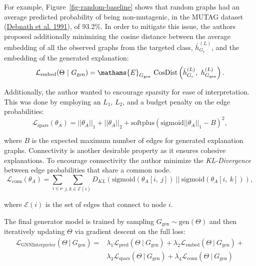 \documentclass[
  11pt,
  letterpaper,
]{article}
\begin{document}
For example, Figure~\ref{fig-random-baseline} shows that random graphs
had an average predicted probability of being non-mutagenic, in the
MUTAG dataset (\protect\hyperlink{ref-Debnath_1991}{Debnath et al.
1991}), of 93.2\%. In order to mitigate this issue, the authors proposed
additionally minimizing the cosine distance between the average
embedding of all the observed graphs from the targeted class,
\(\bar h^{(L)}_{G_c}\), and the embedding of the generated explanation:
\begin{equation} \label{l-embed}
    \mathcal{L}_{\text{embed}}(\Theta \ | \ G_\text{gen}) = \mathams{E}_{G_\text{gen}} \ \text{CosDist}\left( \bar h^{(L)}_{G_c}, \ h^{(L)}_{G_\text{gen}} \right). 
\end{equation}

Additionally, the author wanted to encourage sparsity for ease of
interpretation. This was done by employing an \(L_1\), \(L_2\), and a
budget penalty on the edge probabilities:\\
\begin{equation} \label{l-spars}
    \mathcal{L}_{\text{spars}}(\theta_A) = ||\theta_A||_1 + ||\theta_A||_2 + \text{softplus}(\text{sigmoid}||\theta_A||_1 - B)^2, 
\end{equation}

where \(B\) is the expected maximum number of edges for generated
explanation graphs. Connectivity is another desirable property as it
ensures cohesive explanations. To encourage connectivity the author
minimize the \emph{KL-Divergence} between edge probabilities that share
a common node. \begin{equation}
    \mathcal{L}_{\text{conn}}(\theta_A) = \sum_{i \in \nu} \sum_{j, k \in \mathcal{E}(i)} D_{KL}(\text{sigmoid}(\theta_A[i, \ j]) \ || \ \text{sigmoid}(\theta_A[i, \ k])), 
\end{equation}

where \(\mathcal{E}(i)\) is the set of edges that connect to node \(i\).

\quad The final generator model is trained by sampling
\(G_\text{gen} \sim \text{gen}(\Theta)\) and then iteratively updating
\(\Theta\) via gradient descent on the full loss: \begin{equation}
    \begin{split}
        \mathcal{L}_{\text{GNNInterpreter}}(\Theta \ | \ G_\text{gen}) = 
        &\lambda_1 \mathcal{L}_{\text{pred}}(\Theta \ | \ G_\text{gen}) + 
        \lambda_2 \mathcal{L}_{\text{embed}}(\Theta \ | \ G_\text{gen}) +  \\
        &\lambda_3 \mathcal{L}_{\text{spars}}(\Theta \ | \ G_\text{gen}) +
        \lambda_4 \mathcal{L}_{\text{conn}}(\Theta \ | \ G_\text{gen}) 
    \end{split}
\end{equation}
\end{document}
